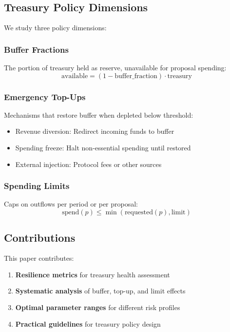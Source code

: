 \subsection{Treasury Policy Dimensions}

We study three policy dimensions:

\subsubsection{Buffer Fractions}

The portion of treasury held as reserve, unavailable for proposal spending:
\begin{equation}
\text{available} = (1 - \text{buffer\_fraction}) \cdot \text{treasury}
\end{equation}

\subsubsection{Emergency Top-Ups}

Mechanisms that restore buffer when depleted below threshold:
\begin{itemize}
    \item Revenue diversion: Redirect incoming funds to buffer
    \item Spending freeze: Halt non-essential spending until restored
    \item External injection: Protocol fees or other sources
\end{itemize}

\subsubsection{Spending Limits}

Caps on outflows per period or per proposal:
\begin{equation}
\text{spend}(p) \leq \min(\text{requested}(p), \text{limit})
\end{equation}

\subsection{Contributions}

This paper contributes:

\begin{enumerate}
    \item \textbf{Resilience metrics} for treasury health assessment
    \item \textbf{Systematic analysis} of buffer, top-up, and limit effects
    \item \textbf{Optimal parameter ranges} for different risk profiles
    \item \textbf{Practical guidelines} for treasury policy design
\end{enumerate}

